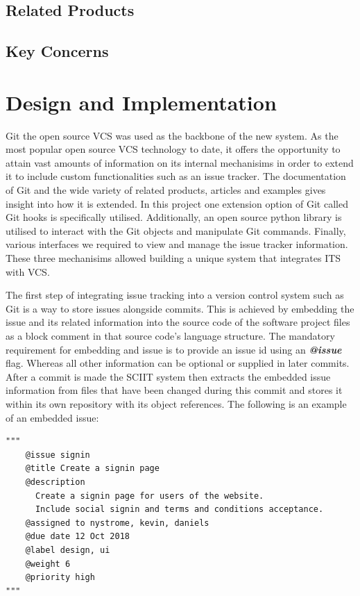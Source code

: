 \documentclass{mproj}
\newenvironment{code}{\captionsetup{type=listing}}{}
\begin{document}
\section{Related Products}

\section{Key Concerns}
\chapter{Design and Implementation}\label{design}


Git the open source VCS was used as the backbone of the new system. As the most popular open source VCS  technology to date, it offers the opportunity to attain vast amounts of information on its internal mechanisims in order to extend it to include custom functionalities such as an issue tracker. The documentation of Git and the wide variety of related products, articles and examples gives insight into how it is extended. In this project one extension option of Git called Git hooks is specifically utilised. Additionally, an open source python library is utilised to interact with the Git objects and manipulate Git commands. Finally, various interfaces we required to view and manage the issue tracker information. These three mechanisims allowed building a unique system that integrates ITS with VCS.


The first step of integrating issue tracking into a version control system such as Git is a way to store issues alongside commits. This is achieved by embedding the issue and its related information into the source code of the software project files as a block comment in that source code's language structure. The mandatory requirement for embedding and issue is to provide an issue id using an \textbf{\textit{@issue}} flag. Whereas all other information can be optional or supplied in later commits. After a commit is made the SCIIT system then extracts the embedded issue information from files that have been changed during this commit and stores it within its own repository with its object references. The following is an example of an embedded issue:

\begin{code}
\begin{verbatim}
"""
    @issue signin
    @title Create a signin page
    @description
      Create a signin page for users of the website. 
      Include social signin and terms and conditions acceptance.
    @assigned to nystrome, kevin, daniels
    @due date 12 Oct 2018
    @label design, ui
    @weight 6
    @priority high    
"""
\end{verbatim}
\end{code}
\end{document}

